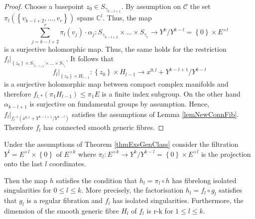\begin{proof}
Choose a basepoint $z_0\in S_{\gamma_{k-l+1}}$. By assumption on $\mathcal{C}$ the set $\pi_l(\left\{v_{k-l+2},\dots,v_r\right\})$ spans $\mathds{C}^l$. Thus, the map
\[
\sum_{j=k-l+2}^r \pi_l(v_j)\cdot \alpha_j: S_{\gamma_{k-l+2}}\times \dots \times S_{\gamma_r} \to Y^k/Y^{k-l} = \left\{0\right\}\times  E^{\times l}
\]
is a surjective holomorphic map. Thus, the same holds for the restriction $f_l|_{\left\{z_0\right\} \times S_{\gamma_{k-l+2}}\times \dots \times S_{\gamma_r}}$. It follows that 
\[
f_l|_{\left\{z_0\right\} \times H_{l-1}} : \left\{z_0\right\} \times H_{l-1}\to x^{0,l}+Y^{k-l+1}/Y^{k-l}
\]
is a surjective holomorphic map between compact complex manifolds and therefore $f_{l,\ast}(\pi_1 H_{l-1})\leq \pi_1 E$ is a finite index subgroup. On the other hand $\alpha_{k-l+1}$ is surjective on fundamental groups by assumption. Hence, $f_l|_{f_l^{-1}(x^{0,l}+ Y^{k-l+1}/Y^{k-l})}$ satisfies the assumptions of Lemma \ref{lemNewConnFib}. Therefore $f_l$ has connected smooth generic fibres.
\end{proof}




\begin{proposition}
Under the assumptions of Theorem \ref{thmExsGenClass} consider the filtration $Y^l=E^{\times l}\times \left\{0\right\}$ of $E^{\times k}$ where $\pi_l: E^{\times k}\rightarrow Y^k/Y^{k-l}= \left\{0\right\}  \times E^{\times l}$ is the projection onto the last $l$ coordinates. 
 
 Then the map $h$ satisfies the condition that $h_l=\pi_l\circ h$ has fibrelong isolated singularities for $0\leq l \leq k$. More precisely, the factorisation $h_l=f_l\circ g_l$ satisfies that $g_l$ is a regular fibration and $f_l$ has isolated singularities. Furthermore, the dimension of the smooth generic fibre $H_l$ of $f_l$ is r-k for $1\leq l \leq k$.
 
 \label{propIsolSingGen}
\end{proposition}

